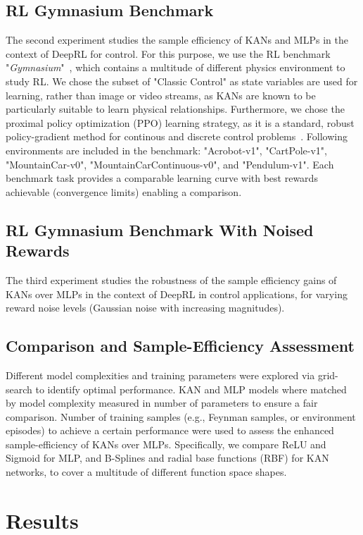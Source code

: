 \documentclass{article}
\begin{document}
\subsection{RL Gymnasium Benchmark}
The second experiment studies the sample efficiency of KANs and MLPs in the context of DeepRL for control.
For this purpose, we use the RL benchmark "\textit{Gymnasium}"~\citep{towers2026gymnasium}, which contains a multitude of different physics environment to study RL.
We chose the subset of "Classic Control" as state variables are used for learning, rather than image or video streams, as KANs are known to be particularly suitable to learn physical relationships.
Furthermore, we chose the proximal policy optimization (PPO) learning strategy, as it is a standard, robust policy-gradient method for continous and discrete control problems~\citep{schulman2017proximal}.
Following environments are included in the benchmark:
"Acrobot-v1", "CartPole-v1", "MountainCar-v0", "MountainCarContinuous-v0", and "Pendulum-v1".
Each benchmark task provides a comparable learning curve with best rewards achievable (convergence limits) enabling a comparison.

\subsection{RL Gymnasium Benchmark With Noised Rewards}
The third experiment studies the robustness of the sample efficiency gains of KANs over MLPs in the context of DeepRL in control applications, for varying reward noise levels (Gaussian noise with increasing magnitudes).

\subsection{Comparison and Sample-Efficiency Assessment}
Different model complexities and training parameters were explored via grid-search to identify optimal performance.
KAN and MLP models where matched by model complexity measured in number of parameters to ensure a fair comparison.
Number of training samples (e.g., Feynman samples, or environment episodes) to achieve a certain performance were used to assess the enhanced sample-efficiency of KANs over MLPs.
Specifically, we compare ReLU and Sigmoid for MLP, and B-Splines and radial base functions (RBF) for KAN networks, to cover a multitude of different function space shapes.


\section{Results}
\end{document}
